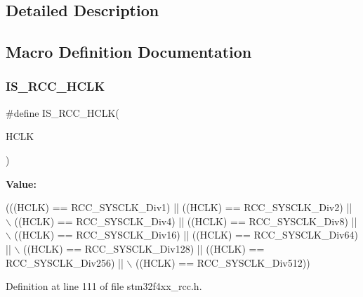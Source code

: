 \subsection{Detailed Description}


\subsection{Macro Definition Documentation}
\mbox{\label{group___r_c_c___a_h_b___clock___source_ga6e9f1c193a2f41bcb3c2f7fa8459b5b3}} 
\subsubsection{\texorpdfstring{I\+S\+\_\+\+R\+C\+C\+\_\+\+H\+C\+LK}{IS\_RCC\_HCLK}}
{\footnotesize\ttfamily \#define I\+S\+\_\+\+R\+C\+C\+\_\+\+H\+C\+LK(\begin{DoxyParamCaption}\item[{}]{H\+C\+LK }\end{DoxyParamCaption})}

{\bfseries Value\+:}
\begin{DoxyCode}
(((HCLK) == RCC\_SYSCLK\_Div1) || ((HCLK) == RCC\_SYSCLK\_Div2) || \(\backslash\)
                           ((HCLK) == RCC\_SYSCLK\_Div4) || ((HCLK) == RCC\_SYSCLK\_Div8) || \(\backslash\)
                           ((HCLK) == RCC\_SYSCLK\_Div16) || ((HCLK) == RCC\_SYSCLK\_Div64) || \(\backslash\)
                           ((HCLK) == RCC\_SYSCLK\_Div128) || ((HCLK) == RCC\_SYSCLK\_Div256) || \(\backslash\)
                           ((HCLK) == RCC\_SYSCLK\_Div512))
\end{DoxyCode}


Definition at line 111 of file stm32f4xx\+\_\+rcc.\+h.

